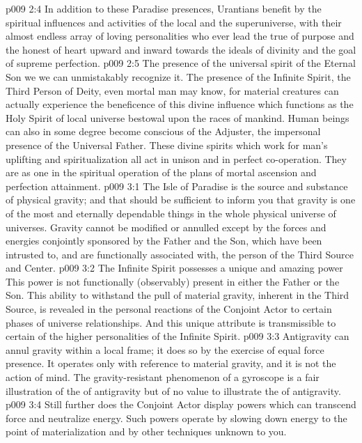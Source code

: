 \vs p009 2:4 In addition to these Paradise presences, Urantians benefit by the spiritual influences and activities of the local and the superuniverse, with their almost endless array of loving personalities who ever lead the true of purpose and the honest of heart upward and inward towards the ideals of divinity and the goal of supreme perfection.
\vs p009 2:5 The presence of the universal spirit of the Eternal Son we  we can unmistakably recognize it. The presence of the Infinite Spirit, the Third Person of Deity, even mortal man may know, for material creatures can actually experience the beneficence of this divine influence which functions as the Holy Spirit of local universe bestowal upon the races of mankind. Human beings can also in some degree become conscious of the Adjuster, the impersonal presence of the Universal Father. These divine spirits which work for man’s uplifting and spiritualization all act in unison and in perfect co\hyp{}operation. They are as one in the spiritual operation of the plans of mortal ascension and perfection attainment.
\vs p009 3:1 The Isle of Paradise is the source and substance of physical gravity; and that should be sufficient to inform you that gravity is one of the most  and eternally dependable things in the whole physical universe of universes. Gravity cannot be modified or annulled except by the forces and energies conjointly sponsored by the Father and the Son, which have been intrusted to, and are functionally associated with, the person of the Third Source and Center.
\vs p009 3:2 \pc The Infinite Spirit possesses a unique and amazing power  This power is not functionally (observably) present in either the Father or the Son. This ability to withstand the pull of material gravity, inherent in the Third Source, is revealed in the personal reactions of the Conjoint Actor to certain phases of universe relationships. And this unique attribute is transmissible to certain of the higher personalities of the Infinite Spirit.
\vs p009 3:3 \pc Antigravity can annul gravity within a local frame; it does so by the exercise of equal force presence. It operates only with reference to material gravity, and it is not the action of mind. The gravity\hyp{}resistant phenomenon of a gyroscope is a fair illustration of the  of antigravity but of no value to illustrate the  of antigravity.
\vs p009 3:4 Still further does the Conjoint Actor display powers which can transcend force and neutralize energy. Such powers operate by slowing down energy to the point of materialization and by other techniques unknown to you.
